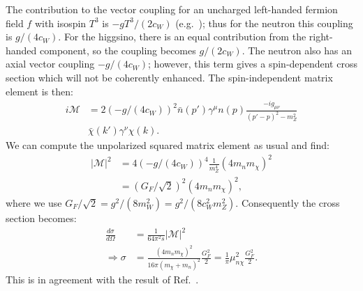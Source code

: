 \documentclass[reprint,superscriptaddress,preprintnumbers,amsmath,amssymb,aps,prd,tightenlines,longbibliography,nofootinbib]{revtex4-2}
\begin{document}
The contribution to the vector coupling for an uncharged left-handed fermion field $f$ with isospin $T^3$ is $-g T^3/(2 c_W)$ (e.g.~\cite{ParticleDataGroup:2026mpi}); thus for the neutron this coupling is $g/(4 c_W)$. For the higgsino, there is an equal contribution from the right-handed component, so the coupling becomes $g/(2c_W)$. The neutron also has an axial vector coupling $-g/(4c_W)$; however, this term gives a spin-dependent cross section which will not be coherently enhanced. The spin-independent matrix element is then:
\begin{align} i \mathcal{M} & = 2 (-g/(4 c_W))^2 \bar{n}(p') \gamma^\mu n(p) \frac{-i g_{\mu \nu}}{(p' - p)^2 - m_Z^2}  \nonumber \\
& \bar{\chi}(k') \gamma^\nu \chi(k). \end{align} 
We can compute the unpolarized squared matrix element as usual and find:
\begin{align} |\mathcal{M}|^2  & = 4 (-g/(4 c_W))^4 \frac{1}{m_Z^4} (4 m_n m_\chi)^2 \nonumber \\
& = (G_F/\sqrt{2})^2 (4 m_n m_\chi)^2, \end{align}
where we use $G_F/\sqrt{2} = g^2/(8 m_W^2) = g^2/(8 c_W^2 m_Z^2)$. Consequently the cross section becomes:
\begin{align}\frac{d\sigma}{d\Omega} & = \frac{1}{64\pi^2 s} |\mathcal{M}|^2 \nonumber \\
\Rightarrow \sigma & = \frac{(4 m_n m_\chi)^2}{16\pi (m_\chi + m_n)^2}   \frac{G_F^2}{2}  =  \frac{1}{\pi} \mu_{n\chi}^2   \frac{G_F^2}{2}. \end{align} 
This is in agreement with the result of Ref.~\cite{Essig:2007az}.



\end{document}
